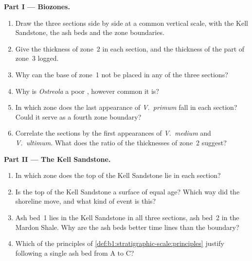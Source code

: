 \begin{problem}
\medskip
\noindent\textbf{Part I --- Biozones.}
\begin{enumerate}
  \item Draw the three sections side by side at a common vertical scale, with
        the Kell Sandstone, the ash beds and the zone boundaries.
  \item Give the thickness of zone~2 in each section, and the thickness of the
        part of zone~3 logged.
  \item Why can the base of zone~1 not be placed in any of the three sections?
  \item Why is \emph{Ostreola} a poor , however common it is?
  \item In which zone does the last appearance of \emph{V.~primum} fall in each
        section? Could it serve as a fourth zone boundary?
  \item Correlate the sections by the first appearances of \emph{V.~medium} and
        \emph{V.~ultimum}. What does the ratio of the thicknesses of zone~2
        suggest?
\end{enumerate}

\noindent\textbf{Part II --- The Kell Sandstone.}
\begin{enumerate}[resume]
  \item In which zone does the top of the Kell Sandstone lie in each section?
  \item Is the top of the Kell Sandstone a surface of equal age? Which way did
        the shoreline move, and what kind of event is this?
  \item Ash bed~1 lies in the Kell Sandstone in all three sections, ash bed~2 in
        the Mardon Shale. Why are the ash beds better time lines than the
         boundary?
  \item Which of the principles of
        \cref{def:b1:stratigraphic-scale:principles} justify following a single
        ash bed from A to C?
\end{enumerate}


\end{problem}
